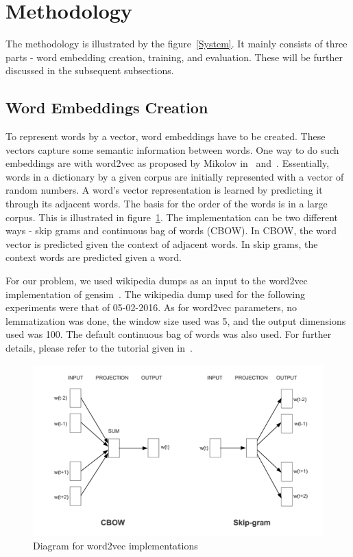 \documentclass[conference]{IEEEtran}
\begin{document}
\section{Methodology}
The methodology is illustrated by the figure~\ref{System}. It mainly consists of three parts - word embedding creation, training, and evaluation. These will be further discussed in the subsequent subsections.




\subsection{Word Embeddings Creation}
To represent words by a vector, word embeddings have to be created. These vectors capture some semantic information between words. One way to do such embeddings are with word2vec as proposed by Mikolov in~\cite{mikolov2013efficient} and~\cite{mikolov2013distributed}. Essentially, words in a dictionary by a given corpus are initially represented with a vector of random numbers. A word's vector representation is learned by predicting it through its adjacent words. The basis for the order of the words is in a large corpus. This is illustrated in figure~\ref{SkipCBOW}. The implementation can be two different ways - skip grams and continuous bag of words (CBOW). In CBOW, the word vector is predicted given the context of adjacent words. In skip grams, the context words are predicted given a word. 

For our problem, we used wikipedia dumps as an input to the word2vec implementation of gensim~\cite{rehurek_lrec}. The wikipedia dump used for the following experiments were that of 05-02-2016. As for word2vec parameters, no lemmatization was done, the window size used was 5, and the output dimensions used was 100. The default continuous bag of words was also used. For further details, please refer to the tutorial given in~\cite{TrainWord2Vec}.

\begin{figure}
\centering
\caption{Diagram for word2vec implementations}
\label{SkipCBOW}
\includegraphics[scale=1]{sentiment_01_large.png}
\end{figure}
\end{document}
